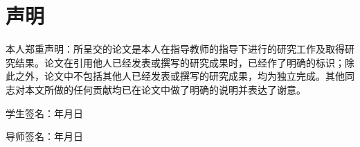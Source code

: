 
{\centering\chapter*{声\hspace{2em}明}}
{
  \songti{}\linespread{2.1}\selectfont
  本人郑重声明：所呈交的论文是本人在指导教师的指导下进行的研究工作及取得研究结果。论文在引用他人已经发表或撰写的研究成果时，已经作了明确的标识；除此之外，论文中不包括其他人已经发表或撰写的研究成果，均为独立完成。其他同志对本文所做的任何贡献均已在论文中做了明确的说明并表达了谢意。\par

  \vspace{4.5cm}

  \begin{flushright}
  
  学生签名：\uline{\makebox[3cm]{}}\hspace{1.5em}\uline{\makebox[4em]{}}年\uline{\makebox[1.5em]{}}月\uline{\makebox[1.5em]{}}日

  \vspace{2cm}

  导师签名：\uline{\makebox[3cm]{}}\hspace{1.5em}\uline{\makebox[4em]{}}年\uline{\makebox[1.5em]{}}月\uline{\makebox[1.5em]{}}日

  \end{flushright}
}